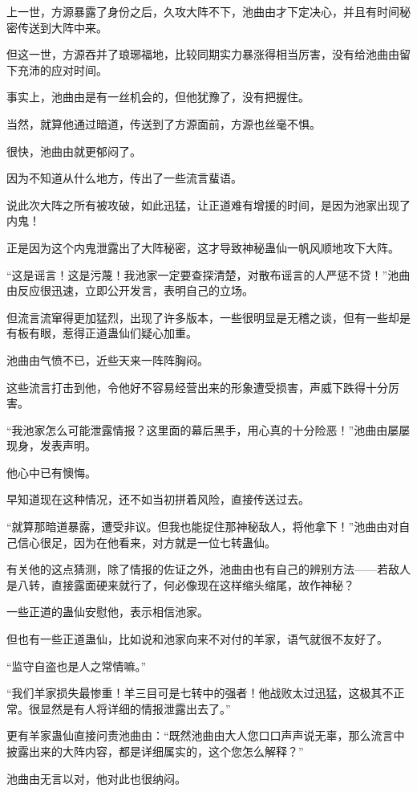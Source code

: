 \begin{this_body}
上一世，方源暴露了身份之后，久攻大阵不下，池曲由才下定决心，并且有时间秘密传送到大阵中来。

但这一世，方源吞并了琅琊福地，比较同期实力暴涨得相当厉害，没有给池曲由留下充沛的应对时间。

事实上，池曲由是有一丝机会的，但他犹豫了，没有把握住。

当然，就算他通过暗道，传送到了方源面前，方源也丝毫不惧。

很快，池曲由就更郁闷了。

因为不知道从什么地方，传出了一些流言蜚语。

说此次大阵之所有被攻破，如此迅猛，让正道难有增援的时间，是因为池家出现了内鬼！

正是因为这个内鬼泄露出了大阵秘密，这才导致神秘蛊仙一帆风顺地攻下大阵。

“这是谣言！这是污蔑！我池家一定要查探清楚，对散布谣言的人严惩不贷！”池曲由反应很迅速，立即公开发言，表明自己的立场。

但流言流窜得更加猛烈，出现了许多版本，一些很明显是无稽之谈，但有一些却是有板有眼，惹得正道蛊仙们疑心加重。

池曲由气愤不已，近些天来一阵阵胸闷。

这些流言打击到他，令他好不容易经营出来的形象遭受损害，声威下跌得十分厉害。

“我池家怎么可能泄露情报？这里面的幕后黑手，用心真的十分险恶！”池曲由屡屡现身，发表声明。

他心中已有懊悔。

早知道现在这种情况，还不如当初拼着风险，直接传送过去。

“就算那暗道暴露，遭受非议。但我也能捉住那神秘敌人，将他拿下！”池曲由对自己信心很足，因为在他看来，对方就是一位七转蛊仙。

有关他的这点猜测，除了情报的佐证之外，池曲由也有自己的辨别方法——若敌人是八转，直接露面硬来就行了，何必像现在这样缩头缩尾，故作神秘？

一些正道的蛊仙安慰他，表示相信池家。

但也有一些正道蛊仙，比如说和池家向来不对付的羊家，语气就很不友好了。

“监守自盗也是人之常情嘛。”

“我们羊家损失最惨重！羊三目可是七转中的强者！他战败太过迅猛，这极其不正常。很显然是有人将详细的情报泄露出去了。”

更有羊家蛊仙直接问责池曲由：“既然池曲由大人您口口声声说无辜，那么流言中披露出来的大阵内容，都是详细属实的，这个您怎么解释？”

池曲由无言以对，他对此也很纳闷。


\end{this_body}

